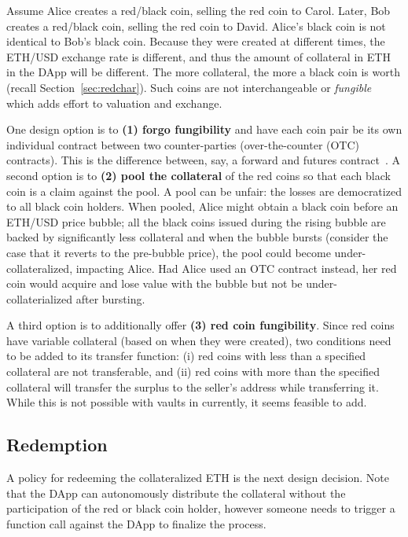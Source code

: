Assume Alice creates a red/black coin, selling the red coin to Carol. Later, Bob creates a red/black coin, selling the red coin to David. Alice's black coin is not identical to Bob's black coin. Because they were created at different times, the ETH/USD exchange rate is different, and thus the  amount of collateral in ETH in the DApp will be different. The more collateral, the more a black coin is worth (recall Section~\ref{sec:redchar}). Such coins are not interchangeable or \textit{fungible} which adds effort to valuation and exchange. 

One design option is to \textbf{(1) forgo fungibility} and have each coin pair be its own individual contract between two counter-parties (\aka over-the-counter (OTC) contracts). This is the difference between, say, a forward and futures contract~\cite{Har03}. A second option is to \textbf{(2) pool the collateral} of the red coins so that each black coin is a claim against the pool. A pool can be unfair: the losses are democratized to all black coin holders. When pooled, Alice might obtain a black coin before an ETH/USD price bubble; all the black coins issued during the rising bubble are backed by significantly less collateral and when the bubble bursts (consider the case that it reverts to the pre-bubble price), the pool could become under-collateralized, impacting Alice. Had Alice used an OTC contract instead, her red coin would acquire and lose value with the bubble but not be under-collaterialized after bursting. 

A third option is to additionally offer \textbf{(3) red coin fungibility}. Since red coins have variable collateral (based on when they were created), two conditions need to be added to its transfer function: (i) red coins with less than a specified collateral are not transferable, and (ii) red coins with more than the specified collateral will transfer the surplus to the seller’s address while transferring it. While this is not possible with vaults in \dai currently, it seems feasible to add.
	

\subsection{Redemption}
\label{sec:maturity}

A policy for redeeming the collateralized ETH is the next design decision. Note that the DApp can autonomously distribute the collateral without the participation of the red or black coin holder, however someone needs to trigger a function call against the DApp to finalize the process.

